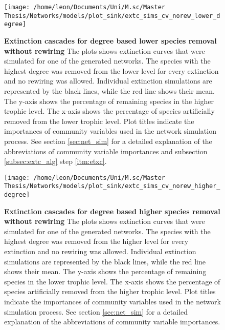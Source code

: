 \documentclass[12pt,a4paper]{article}
\begin{document}
\begin{figure}[H]
	 \centering
	 \texttt{[image: /home/leon/Documents/Uni/M.sc/Master Thesis/Networks/models/plot\_sink/extc\_sims\_cv\_norew\_lower\_degree]}
	 \captionsetup{width = \textwidth}
	 \caption[Extinction cascades for degree based lower species removal without rewiring]{\textbf{Extinction cascades for degree based lower species removal without rewiring} The plots shows extinction curves that were simulated for one of the generated networks. The species with the highest degree was removed from the lower level for every extinction and no rewiring was allowed. Individual extinction simulations are represented by the black lines, while the red line shows their mean. The y-axis shows the percentage of remaining species in the higher trophic level. The x-axis shows the percentage of species artificially removed from the lower trophic level. Plot titles indicate the importances of community variables used in the network simulation process. See section \ref{sec:net_sim} for a detailed explanation of the abbreviations of community variable importances and subsection \ref{subsec:extc_alg} step \ref{itm:etxc}.}
	 \label{fig:extc_cv_norew_lower_deg}
\end{figure}


\begin{figure}[H]
	 \centering
	 \texttt{[image: /home/leon/Documents/Uni/M.sc/Master Thesis/Networks/models/plot\_sink/extc\_sims\_cv\_norew\_higher\_degree]}
	 \captionsetup{width = \textwidth}
	 \caption[Extinction cascades for degree based higher species removal without rewiring]{\textbf{Extinction cascades for degree based higher species removal without rewiring} The plots shows extinction curves that were simulated for one of the generated networks. The species with the highest degree was removed from the higher level for every extinction and no rewiring was allowed. Individual extinction simulations are represented by the black lines, while the red line shows their mean. The y-axis shows the percentage of remaining species in the lower trophic level. The x-axis shows the percentage of species artificially removed from the higher trophic level. Plot titles indicate the importances of community variables used in the network simulation process. See section \ref{sec:net_sim} for a detailed explanation of the abbreviations of community variable importances.}
	 \label{fig:extc_cv_norew_higher_deg}
\end{figure}
\end{document}

